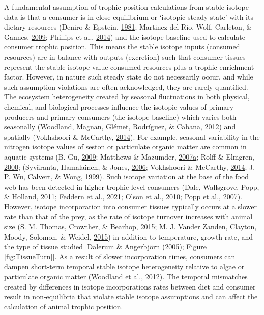 \documentclass [11pt, proquest] {uwthesis}[2015/03/03]
\begin{document}
A fundamental assumption of trophic position calculations from stable
isotope data is that a consumer is in close equilibrium or `isotopic
steady state' with its dietary resources (Deniro \& Epstein,
\protect\hyperlink{ref-Deniro1981}{1981}; Martinez del Rio, Wolf,
Carleton, \& Gannes, \protect\hyperlink{ref-DelRio2009}{2009}; Phillips
et al., \protect\hyperlink{ref-Phillips2014}{2014}) and the isotope
baseline used to calculate consumer trophic position. This means the
stable isotope inputs (consumed resources) are in balance with outputs
(excretion) such that consumer tissues represent the stable isotope
value consumed resources plus a trophic enrichment factor. However, in
nature such steady state do not necessarily occur, and while such
assumption violations are often acknowledged, they are rarely
quantified. The ecosystem heterogeneity created by seasonal fluctuations
in both physical, chemical, and biological processes influence the
isotopic values of primary producers and primary consumers (the isotope
baseline) which varies both seasonally (Woodland, Magnan, Glémet,
Rodríguez, \& Cabana, \protect\hyperlink{ref-Woodland2012}{2012}) and
spatially (Vokhshoori \& McCarthy,
\protect\hyperlink{ref-Vokshoori2014}{2014}). For example, seasonal
variability in the nitrogen isotope values of seston or particulate
organic matter are common in aquatic systems (B. Gu,
\protect\hyperlink{ref-Gu2009}{2009}; Matthews \& Mazumder,
\protect\hyperlink{ref-Matthews2007}{2007}\protect\hyperlink{ref-Matthews2007}{a};
Rolff \& Elmgren, \protect\hyperlink{ref-Rolff2000}{2000}; (Syväranta,
Hamalainen, \& Jones, \protect\hyperlink{ref-Syvaranta2006}{2006};
Vokhshoori \& McCarthy, \protect\hyperlink{ref-Vokshoori2014}{2014}; J.
P. Wu, Calvert, \& Wong, \protect\hyperlink{ref-Wu1999}{1999}). Such
isotope variation at the base of the food web has been detected in
higher trophic level consumers (Dale, Wallsgrove, Popp, \& Holland,
\protect\hyperlink{ref-Dale2011}{2011}; Feddern et al.,
\protect\hyperlink{ref-Feddern2021}{2021}; Olson et al.,
\protect\hyperlink{ref-Olson2010}{2010}; Popp et al.,
\protect\hyperlink{ref-Popp2007}{2007}). However, isotope incorporation
into consumer tissues typically occurs at a slower rate than that of the
prey, as the rate of isotope turnover increases with animal size (S. M.
Thomas, Crowther, \& Bearhop, \protect\hyperlink{ref-Thomas2015}{2015};
M. J. Vander Zanden, Clayton, Moody, Solomon, \& Weidel,
\protect\hyperlink{ref-VanderZanden2015}{2015}) in addition to
temperature, growth rate, and the type of tissue studied {[}Dalerum \&
Angerbjörn (\protect\hyperlink{ref-Dalerum2005}{2005}); Figure
\ref{fig:TissueTurn}{]}. As a result of slower incorporation times,
consumers can dampen short-term temporal stable isotope heterogeneity
relative to algae or particulate organic matter (Woodland et al.,
\protect\hyperlink{ref-Woodland2012}{2012}). The temporal mismatches
created by differences in isotope incorporations rates between diet and
consumer result in non-equilibria that violate stable isotope
assumptions and can affect the calculation of animal trophic position.
\end{document}
